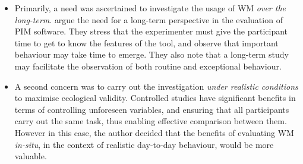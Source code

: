 \begin{itemize}
\item Primarily, a need was ascertained to investigate the usage of WM \textit{over the long-term}.  \citet{ml:92} argue the need for a long-term perspective in the evaluation of PIM software.  They stress that the experimenter must give the participant time to get to know the features of the tool, and observe that important behaviour may take time to emerge.  They also note that a long-term study may facilitate the observation of both routine and exceptional behaviour. 

\item A second concern was to carry out the investigation \textit{under realistic conditions} to maximise ecological validity.  Controlled studies have significant benefits in terms of controlling unforeseen variables, and ensuring that all participants carry out the same task, thus enabling effective comparison between them.  However in this case, the author decided that the benefits of evaluating WM \textit{in-situ}, in the context of realistic day-to-day behaviour, would be more valuable.  %

\end{itemize}



